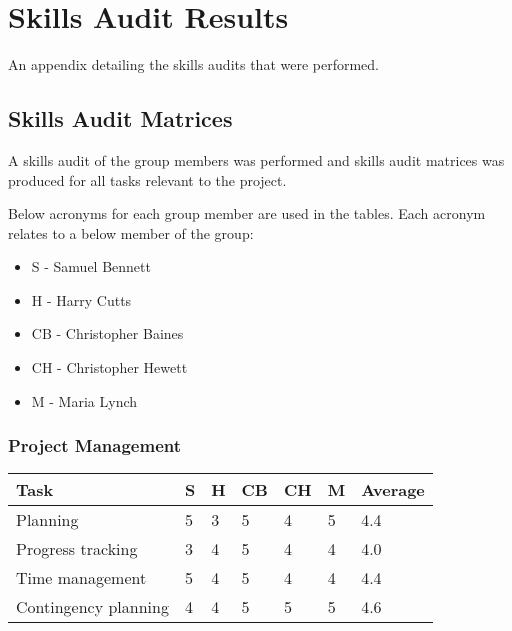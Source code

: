 \chapter{Skills Audit Results} \label{App:Skills Audit Results}

\begin{preamble}
	An appendix detailing the skills audits that were performed.
\end{preamble}

\section{Skills Audit Matrices} 
\label{Section:Skills Audit Matrices}
A skills audit of the group members was performed and skills audit matrices was produced for all tasks relevant to the project.

Below acronyms for each group member are used in the tables. Each acronym relates to a below member of the group:

\begin{itemize}
\item S - Samuel Bennett
\item H - Harry Cutts
\item CB - Christopher Baines
\item CH - Christopher Hewett
\item M - Maria Lynch
\end{itemize}

\subsection{Project Management} 
\begin{tabular}{ l || l | l | l | l | l || l}
  Task & S & H & CB & CH & M & Average \\ \hline
  Planning & 5  &  3  &  5  &  4  &  5  &  4.4 \\ 
  Progress tracking &  3  &  4  &  5  &  4  &  4  &  4.0 \\
  Time management &  5  &  4  &  5  &  4  &  4  &  4.4 \\
  Contingency planning &  4  &  4  &  5  &  5  &  5  &  4.6 \\
\end{tabular}

